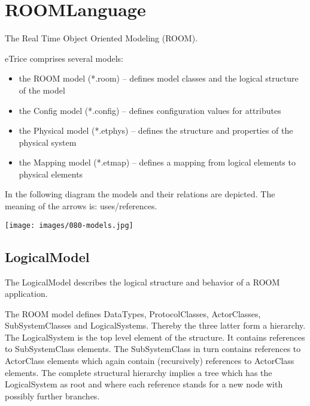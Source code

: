 \section{ROOMLanguage}
	The Real Time Object Oriented Modeling (ROOM).
	
	eTrice comprises several models:
	
	\begin{itemize}
	\item the ROOM model (*.room) -- defines model classes and the logical structure of the model
	\item the Config model (*.config) -- defines configuration values for attributes
	\item the Physical model (*.etphys) -- defines the structure and properties of the physical system
	\item the Mapping model (*.etmap) -- defines a mapping from logical elements to physical elements
	\end{itemize}
	
	In the following diagram the models and their relations are depicted. The meaning of the arrows is: uses/references.
	\begin{center}
		\texttt{[image: images/080-models.jpg]}
	\end{center}
	
	\subsection{LogicalModel}
	The LogicalModel describes the logical structure and behavior of a ROOM application.
	
	The ROOM model defines DataTypes, ProtocolClasses, ActorClasses, SubSystemClasses and LogicalSystems.
	Thereby the three latter form a hierarchy. The LogicalSystem is the top level element of the structure. 
	It contains references to SubSystemClass elements. The SubSystemClass in turn contains 
	references to ActorClass elements which again contain (recursively) references to 
	ActorClass elements. The complete structural hierarchy implies a tree which has the 
	LogicalSystem as root and where each reference stands for a new node with possibly further 
	branches.
	
